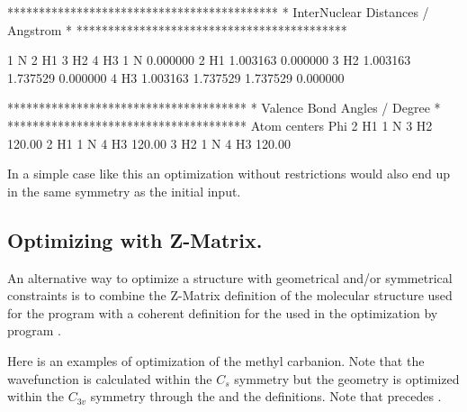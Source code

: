 \begin{sourcelisting}
                    *******************************************
                    *    InterNuclear Distances / Angstrom    *
                    *******************************************

               1 N             2 H1            3 H2            4 H3
    1 N        0.000000
    2 H1       1.003163        0.000000
    3 H2       1.003163        1.737529        0.000000
    4 H3       1.003163        1.737529        1.737529        0.000000

                    **************************************
                    *    Valence Bond Angles / Degree    *
                    **************************************
                          Atom centers                 Phi
                      2 H1       1 N        3 H2       120.00
                      2 H1       1 N        4 H3       120.00
                      3 H2       1 N        4 H3       120.00

\end{sourcelisting}

In a simple case like this an optimization without
restrictions would also end up in the same symmetry as the initial
input.


\subsection{Optimizing with Z-Matrix.}

An alternative way to optimize a structure with geometrical and/or symmetrical
constraints is to combine the Z-Matrix definition of the molecular structure 
used for the program  with a coherent definition for the 
 used in the optimization by program .

Here is an examples of optimization of the methyl carbanion. Note that the 
wavefunction is calculated within the $C_s$ symmetry but the geometry is optimized
within the $C_{3v}$ symmetry through the  and the  definitions. Note that  precedes .


